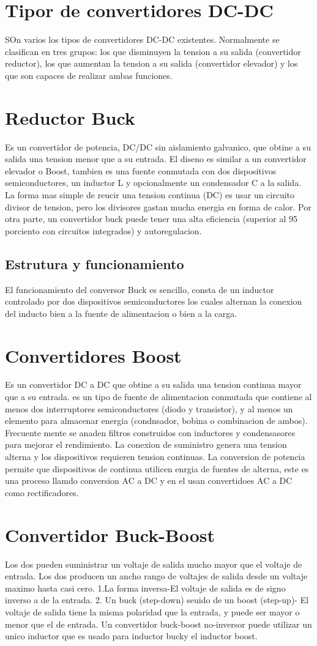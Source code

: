 \documentclass[12pt,a4paper]{report}
\begin{document}
\section{Tipor de convertidores DC-DC}
SOn varios los tipos de convertidores DC-DC existentes. Normalmente se clasifican en tres grupos: los que disminuyen la tension a su salida (convertidor reductor), los que aumentan la tension a su salida (convertidor elevador) y los que son capaces de realizar ambas funciones.
\section{Reductor Buck}
Es un convertidor de potencia, DC/DC sin aislamiento galvanico, que obtine a su salida una tension menor que a su entrada. El diseno es similar a un convertidor elevador o Boost, tambien es una fuente conmutada con dos dispositivos semiconductores, un inductor L y opcionalmente un condensador C a la salida.
La forma mas simple de reucir una tension continua (DC) es usar un circuito divisor de tension, pero los divisores gastan mucha energia en forma de calor. Por otra parte, un convertidor buck puede tener una alta eficiencia (superior al 95 porciento con circuitos integrados) y autoregulacion.
\subsection{Estrutura y funcionamiento}
El funcionamiento del conversor Buck es sencillo, consta de un inductor controlado por dos dispositivos semiconductores los cuales alternan la conexion del inducto bien a la fuente de alimentacion o bien a la carga.
\section{Convertidores Boost}
Es un convertidor DC a DC que obtine a su salida una tension continua mayor que a su entrada. es un tipo de fuente de alimentacion conmutada que contiene al menos dos interruptores semiconductores (diodo y transistor), y al menos un elemento para almacenar energia (condnsador, bobina o combinacion de ambos). Frecuente mente se anaden filtros construidos con inductores y condensasores para mejorar el rendimiento.
La conexion de suministro genera una tension alterna y los dispositivos requieren tension continuas. La conversion de potencia permite que dispositivos de continua utilicen enrgia de fuentes de alterna, este es una proceso llamdo conversion AC a DC y en el usan convertidoes AC a DC como rectificadores.
\section{Convertidor Buck-Boost}
Los dos pueden suministrar un voltaje de salida mucho mayor que el voltaje de entrada. Los dos producen un ancho rango de voltajes de salida desde un voltaje maximo hasta casi cero. 1.La forma inversa-El voltaje de salida es de signo inverso a de la entrada. 2. Un buck (step-down) seuido de un boost (step-up)- El voltaje de salida tiene la misma polaridad que la entrada, y puede ser mayor o menor que el de entrada. Un convertidor buck-boost no-inversor puede utilizar un unico inductor que es usado para inductor bucky el inductor boost.
\end{document}
